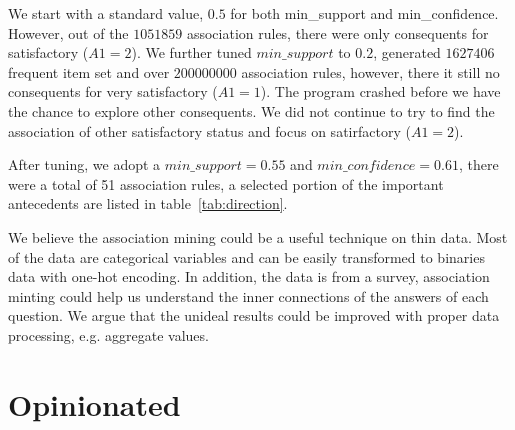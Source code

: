 \documentclass[11pt,twocolumn,letterpaper]{article}
\begin{document}
We start with a standard value, $0.5$ for both min\_support and min\_confidence. However, out of the $1051859$ association rules, there were only consequents for satisfactory ($A1=2$).
We further tuned $min\_support$ to $0.2$, generated $1627406$ frequent item set and over $200000000$ association rules, however, there it still no consequents for very satisfactory ($A1=1$).
The program crashed before we have the chance to explore other consequents.
We did not continue to try to find the association of other satisfactory status and focus on satirfactory ($A1=2$).

After tuning, we adopt a $min\_support=0.55$ and $min\_confidence=0.61$, there were a total of 51 association rules, a selected portion of the important antecedents are listed in table~\ref{tab:direction}.

We believe the association mining could be a useful technique on thin data.
Most of the data are categorical variables and can be easily transformed to binaries data with one-hot encoding.
In addition, the data is from a survey, association minting could help us understand the inner connections of the answers of each question.
We argue that the unideal results could be improved with proper data processing, e.g. aggregate values.

\section{Opinionated}\label{opinionated}

\begin{table}[htb!]
\vspace{-1mm}
    \caption{Confusion Matrix of different models in classifying $Opinionated$. Values are sum over $10$-fold evaluations.}
\label{tab:opinionated:confusion}\vspace{-3mm}
\end{table}
\end{document}
